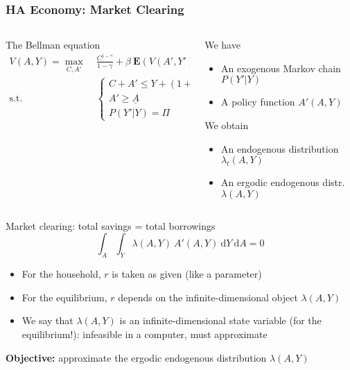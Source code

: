 \documentclass[10pt, aspectratio=1610, natbib, handout]{beamer}
\newcommand{\E}{\mathbf{E}}
\begin{document}
  \begin{frame}
    \frametitle{HA Economy: Market Clearing}

    \begin{columns}[T]
      \begin{column}{0.48\textwidth}
        The Bellman equation
        \begin{align*}
          V(A, Y) = \max_{C, A'} &\; \frac{C^{1-\gamma}}{1-\gamma} + \beta\ \E \left( V(A', Y') \middle| A, Y \right) \\
          \text{s.t.} &\;
          \begin{cases}
            C + A' \leq Y + (1 + r) A \\
            A' \geq \underline{A} \\
            P(Y' | Y) = \Pi
          \end{cases}
        \end{align*}
      \end{column}
      \begin{column}{0.48\textwidth}
        We have
        \begin{itemize}
          \item An exogenous Markov chain $P(Y' | Y)$
          \item A policy function $A'(A, Y)$
        \end{itemize}
        \vspace{1em}
        We obtain
        \begin{itemize}
          \item An endogenous distribution $\lambda_t(A, Y)$
          \item An ergodic endogenous distr.~$\lambda(A, Y)$
        \end{itemize}
      \end{column}
    \end{columns}

    \vfill\pause

    Market clearing: total savings = total borrowings
    \begin{equation*}
      \int_A \int_Y \lambda(A, Y)\ A'(A, Y)\ \text{d} Y\ \text{d} A = 0
    \end{equation*}
    \begin{itemize}
      \item For the household, $r$ is taken as given (like a parameter)
      \item For the equilibrium, $r$ depends on the infinite-dimensional object $\lambda(A, Y)$
      \item We say that $\lambda(A, Y)$ is an infinite-dimensional state variable (for the equilibrium!): infeasible in a computer, must approximate
    \end{itemize}

    \vfill\pause

    \textbf{Objective:} approximate the ergodic endogenous distribution $\lambda(A, Y)$
  \end{frame}
\end{document}
